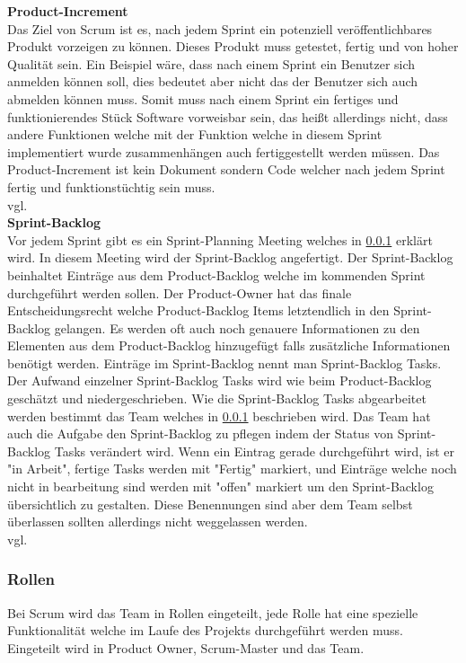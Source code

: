 			\textbf{Product-Increment} \\
			Das Ziel von Scrum ist es, nach jedem Sprint ein potenziell veröffentlichbares Produkt vorzeigen zu können. Dieses Produkt muss getestet, fertig und von hoher Qualität sein. Ein Beispiel wäre, dass nach einem Sprint ein Benutzer sich anmelden können soll, dies bedeutet aber nicht das der Benutzer sich auch abmelden können muss. Somit muss nach einem Sprint ein fertiges und funktionierendes Stück Software vorweisbar sein, das heißt allerdings nicht, dass andere Funktionen welche mit der Funktion welche in diesem Sprint implementiert wurde zusammenhängen auch fertiggestellt werden müssen. Das Product-Increment ist kein Dokument sondern Code welcher nach jedem Sprint fertig und funktionstüchtig sein muss.\\ vgl. \textcite{ScrumProduct-Increment}\\

			\textbf{Sprint-Backlog} \\ 
			Vor jedem Sprint gibt es ein Sprint-Planning Meeting welches in \ref{sec:Rollen} erklärt wird. In diesem Meeting wird der Sprint-Backlog angefertigt. Der Sprint-Backlog beinhaltet Einträge aus dem Product-Backlog welche im kommenden Sprint durchgeführt werden sollen. Der Product-Owner hat das finale Entscheidungsrecht welche Product-Backlog Items letztendlich in den Sprint-Backlog gelangen. Es werden oft auch noch genauere Informationen zu den Elementen aus dem Product-Backlog hinzugefügt falls zusätzliche Informationen benötigt werden.
			Einträge im Sprint-Backlog nennt man Sprint-Backlog Tasks. Der Aufwand einzelner Sprint-Backlog Tasks wird wie beim Product-Backlog geschätzt und niedergeschrieben.
			Wie die Sprint-Backlog Tasks abgearbeitet werden bestimmt das Team welches in \ref{sec:Rollen} beschrieben wird. Das Team hat auch die Aufgabe den Sprint-Backlog zu pflegen indem der Status von Sprint-Backlog Tasks verändert wird. Wenn ein Eintrag gerade durchgeführt wird, ist er "in Arbeit", fertige Tasks werden mit "Fertig" markiert, und Einträge welche noch nicht in bearbeitung sind werden mit "offen" markiert um den Sprint-Backlog übersichtlich zu gestalten. Diese Benennungen sind aber dem Team selbst überlassen sollten allerdings nicht weggelassen werden.\\ vgl. \textcite{ScrumSprint-Backlog} \\ 
		
	\subsubsection{Rollen}
	\label{sec:Rollen}
		Bei Scrum wird das Team in Rollen eingeteilt, jede Rolle hat eine spezielle Funktionalität welche im Laufe des Projekts durchgeführt werden muss. Eingeteilt wird in Product Owner, Scrum-Master und das Team. \\

